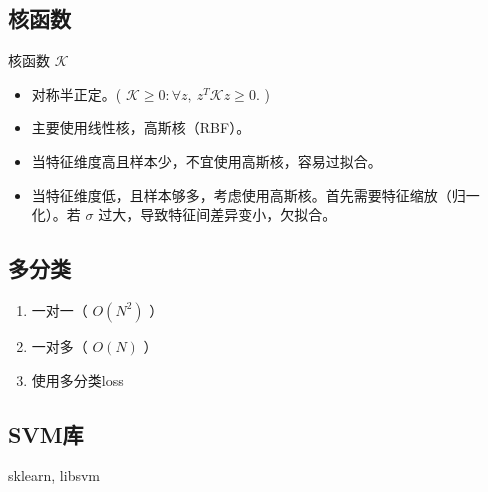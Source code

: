 \documentclass[letterpaper,10pt,english]{sphinxmanual}
\begin{document}
\subsection{核函数}
\label{\detokenize{machineLearning/02_svm:id2}}
核函数 \(\mathcal{K}\)
\begin{itemize}
\item {} 
对称半正定。( \(\mathcal{K} \geqslant 0: \forall z,\  z^T\mathcal{K}z \geqslant 0.\) )

\item {} 
主要使用线性核，高斯核（RBF）。

\item {} 
当特征维度高且样本少，不宜使用高斯核，容易过拟合。

\item {} 
当特征维度低，且样本够多，考虑使用高斯核。首先需要特征缩放（归一化）。若 \(\sigma\) 过大，导致特征间差异变小，欠拟合。

\end{itemize}


\subsection{多分类}
\label{\detokenize{machineLearning/02_svm:id3}}\begin{enumerate}
\item {} 
一对一（ \(O(N^2)\) ）

\item {} 
一对多（ \(O(N)\) ）

\item {} 
使用多分类loss

\end{enumerate}


\subsection{SVM库}
\label{\detokenize{machineLearning/02_svm:svm}}
sklearn, libsvm
\end{document}
